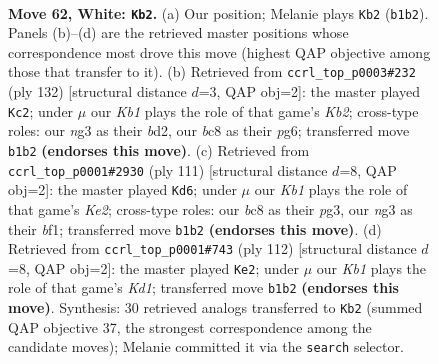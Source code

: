 \documentclass[11pt]{article}
\begin{document}
\clearpage

\begin{figure}[p]\centering
\begin{subfigure}{0.46\textwidth}\centering
\resizebox{\linewidth}{!}{%
\newchessgame
\chessboard[
  setfen={2b5/k7/8/P7/1P6/4N1n1/3p4/1K6 w - - 2 62},
  showmover=false,
  pgfstyle=straightmove, color=movearrow, markmove={b1-b2}
]}
\caption{}
\end{subfigure}\hfill
\begin{subfigure}{0.46\textwidth}\centering
\resizebox{\linewidth}{!}{%
\newchessgame
\chessboard[
  setfen={8/8/4k1p1/8/4P2p/5P1N/1K1b4/8 w - - 1 67},
  showmover=false,
  pgfstyle=straightmove, color=movearrow, markmove={b2-c2}
]}
\caption{}
\end{subfigure}
\\[4pt]
\begin{subfigure}{0.46\textwidth}\centering
\resizebox{\linewidth}{!}{%
\newchessgame
\chessboard[
  setfen={8/2n1k3/2P2p2/6p1/4K3/6P1/8/5B2 b - - 0 56},
  showmover=false,
  pgfstyle=straightmove, color=movearrow, markmove={e7-d6}
]}
\caption{}
\end{subfigure}\hfill
\begin{subfigure}{0.46\textwidth}\centering
\resizebox{\linewidth}{!}{%
\newchessgame
\chessboard[
  setfen={8/8/8/4k1b1/4p1P1/7P/6N1/3K4 w - - 5 57},
  showmover=false,
  pgfstyle=straightmove, color=movearrow, markmove={d1-e2}
]}
\caption{}
\end{subfigure}
\caption{\textbf{Move 62, White: \texttt{Kb2}.} (a) Our position; Melanie plays \texttt{Kb2} (\texttt{b1b2}). Panels (b)--(d) are the retrieved master positions whose correspondence most drove this move (highest QAP objective among those that transfer to it). (b) Retrieved from \texttt{ccrl\_top\_p0003\#232} (ply 132) [structural distance $d$=3, QAP obj=2]: the master played \texttt{Kc2}; under $\mu$ our \emph{Kb1} plays the role of that game's \emph{Kb2}; cross-type roles: our \emph{n}g3 as their \emph{b}d2, our \emph{b}c8 as their \emph{p}g6; transferred move \texttt{b1b2} \textbf{(endorses this move)}. (c) Retrieved from \texttt{ccrl\_top\_p0001\#2930} (ply 111) [structural distance $d$=8, QAP obj=2]: the master played \texttt{Kd6}; under $\mu$ our \emph{Kb1} plays the role of that game's \emph{Ke2}; cross-type roles: our \emph{b}c8 as their \emph{p}g3, our \emph{n}g3 as their \emph{b}f1; transferred move \texttt{b1b2} \textbf{(endorses this move)}. (d) Retrieved from \texttt{ccrl\_top\_p0001\#743} (ply 112) [structural distance $d$=8, QAP obj=2]: the master played \texttt{Ke2}; under $\mu$ our \emph{Kb1} plays the role of that game's \emph{Kd1}; transferred move \texttt{b1b2} \textbf{(endorses this move)}. Synthesis: 30 retrieved analogs transferred to \texttt{Kb2} (summed QAP objective 37, the strongest correspondence among the candidate moves); Melanie committed it via the \texttt{search} selector.}
\label{fig:thought-m122}
\end{figure}
\end{document}
